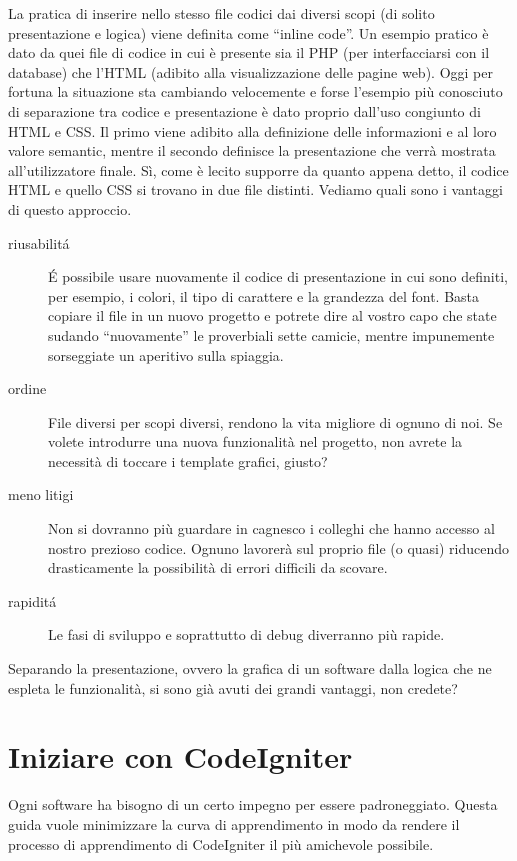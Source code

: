 La pratica di inserire nello stesso file codici dai diversi scopi (di solito presentazione e logica) viene definita come ``inline code''. Un esempio pratico è dato da quei file di codice in cui è presente sia il \ac{PHP} (per interfacciarsi con il database) che l'\ac{HTML} (adibito alla visualizzazione delle pagine web). Oggi per fortuna la situazione sta cambiando velocemente e forse l'esempio più conosciuto di separazione tra codice e presentazione è dato proprio dall'uso congiunto di \ac{HTML} e \ac{CSS}. Il primo viene adibito alla definizione delle informazioni e al loro valore semantic, mentre il secondo definisce la presentazione che verrà mostrata all'utilizzatore finale. Sì, come è lecito supporre da quanto appena detto, il codice \ac{HTML} e quello \ac{CSS} si trovano in due file distinti. Vediamo quali sono i vantaggi di questo approccio.

\begin{description}
\item [riusabilit\'a] \'E possibile usare nuovamente il codice di presentazione in cui sono definiti, per esempio, i colori, il tipo di carattere e la grandezza del font. Basta copiare il file in un nuovo progetto e potrete dire al vostro capo che state sudando ``nuovamente'' le proverbiali sette camicie, mentre impunemente sorseggiate un aperitivo sulla spiaggia. 
\item [ordine] File diversi per scopi diversi, rendono la vita migliore di ognuno di noi. Se volete introdurre una nuova funzionalità nel progetto, non avrete la necessità di toccare i template grafici, giusto?
\item [meno litigi] Non si dovranno più guardare in cagnesco i colleghi che hanno accesso al nostro prezioso codice. Ognuno lavorerà sul proprio file (o quasi) riducendo drasticamente la possibilità di errori difficili da scovare.
\item [rapidit\'a] Le fasi di sviluppo e soprattutto di debug diverranno più rapide.
\end{description}

Separando la presentazione, ovvero la grafica di un software dalla logica che ne espleta le funzionalità, si sono già avuti dei grandi vantaggi, non credete?


\label{sec:config}
\section{Iniziare con CodeIgniter}
Ogni software ha bisogno di un certo impegno per essere padroneggiato. Questa guida vuole minimizzare la curva di apprendimento in modo da rendere il processo di apprendimento di CodeIgniter il più amichevole possibile.

